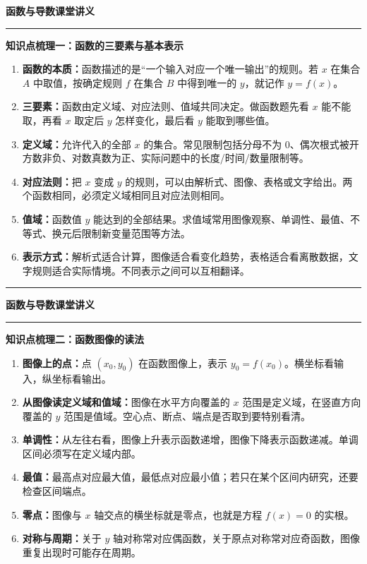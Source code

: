 \documentclass[12pt,a4paper]{ctexart}
\newcommand{\lessonTitle}[2]{
  \begin{center}
    {\LARGE\bfseries #1}
  \end{center}
  \vspace{0.2em}
  \hrule
  \vspace{0.8em}
}
\begin{document}
\lessonTitle{函数与导数课堂讲义}{}

\textbf{\large 知识点梳理一：函数的三要素与基本表示}

\begin{enumerate}
  \item \textbf{函数的本质：}函数描述的是“一个输入对应一个唯一输出”的规则。若 $x$ 在集合 $A$ 中取值，按确定规则 $f$ 在集合 $B$ 中得到唯一的 $y$，就记作 $y=f(x)$。
  \item \textbf{三要素：}函数由定义域、对应法则、值域共同决定。做函数题先看 $x$ 能不能取，再看 $x$ 取定后 $y$ 怎样变化，最后看 $y$ 能取到哪些值。
  \item \textbf{定义域：}允许代入的全部 $x$ 的集合。常见限制包括分母不为 $0$、偶次根式被开方数非负、对数真数为正、实际问题中的长度/时间/数量限制等。
  \item \textbf{对应法则：}把 $x$ 变成 $y$ 的规则，可以由解析式、图像、表格或文字给出。两个函数相同，必须定义域相同且对应法则相同。
  \item \textbf{值域：}函数值 $y$ 能达到的全部结果。求值域常用图像观察、单调性、最值、不等式、换元后限制新变量范围等方法。
  \item \textbf{表示方式：}解析式适合计算，图像适合看变化趋势，表格适合看离散数据，文字规则适合实际情境。不同表示之间可以互相翻译。
\end{enumerate}

\vspace{0.5em}
\hrule

\newpage
\lessonTitle{函数与导数课堂讲义}{}

\textbf{\large 知识点梳理二：函数图像的读法}

\begin{enumerate}
  \item \textbf{图像上的点：}点 $(x_0,y_0)$ 在函数图像上，表示 $y_0=f(x_0)$。横坐标看输入，纵坐标看输出。
  \item \textbf{从图像读定义域和值域：}图像在水平方向覆盖的 $x$ 范围是定义域，在竖直方向覆盖的 $y$ 范围是值域。空心点、断点、端点是否取到要特别看清。
  \item \textbf{单调性：}从左往右看，图像上升表示函数递增，图像下降表示函数递减。单调区间必须写在定义域内部。
  \item \textbf{最值：}最高点对应最大值，最低点对应最小值；若只在某个区间内研究，还要检查区间端点。
  \item \textbf{零点：}图像与 $x$ 轴交点的横坐标就是零点，也就是方程 $f(x)=0$ 的实根。
  \item \textbf{对称与周期：}关于 $y$ 轴对称常对应偶函数，关于原点对称常对应奇函数，图像重复出现时可能存在周期。
\end{enumerate}
\end{document}
